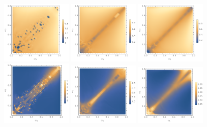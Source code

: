 \documentclass[11pt]{book}
\begin{document}
\begin{figure}[p]
    \centering
    \includegraphics[width=0.3\textwidth]{plot/energy-ratio-axion-1d.png}
    \includegraphics[width=0.3\textwidth]{plot/energy-ratio-axion-2d.png}
    \includegraphics[width=0.3\textwidth]{plot/energy-ratio-axion-3d.png} \\
    \includegraphics[width=0.3\textwidth]{plot/r_max-axion-1d.png}
    \includegraphics[width=0.3\textwidth]{plot/r_max-axion-2d.png}
    \includegraphics[width=0.3\textwidth]{plot/r_max-axion-3d.png} \\

\end{figure}
\end{document}
